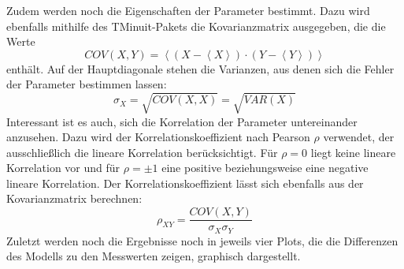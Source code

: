 Zudem werden noch die Eigenschaften der Parameter bestimmt. Dazu wird ebenfalls mithilfe des TMinuit-Pakets die Kovarianzmatrix ausgegeben, die die Werte
\begin{equation}
COV(X,Y)=\left<\left(X-\left<X\right>\right)\cdot\left(Y-\left<Y\right>\right)\right>
\end{equation}
enthält. Auf der Hauptdiagonale stehen die Varianzen, aus denen sich die Fehler der Parameter bestimmen lassen:
\begin{equation}
\sigma_X=\sqrt{COV(X,X)}=\sqrt{VAR(X)}
\end{equation}
Interessant ist es auch, sich die Korrelation der Parameter untereinander anzusehen. Dazu wird der Korrelationskoeffizient nach Pearson $\rho$ verwendet, der ausschließlich die lineare Korrelation berücksichtigt. Für $\rho=0$ liegt keine lineare Korrelation vor und für $\rho=\pm1$ eine positive beziehungsweise eine negative lineare Korrelation. Der Korrelationskoeffizient lässt sich ebenfalls aus der Kovarianzmatrix berechnen:
\begin{equation}
\rho_{XY}=\frac{COV(X,Y)}{\sigma_X\sigma_Y}
\end{equation}
Zuletzt werden noch die Ergebnisse noch in jeweils vier Plots, die die Differenzen des Modells zu den Messwerten zeigen, graphisch dargestellt.



